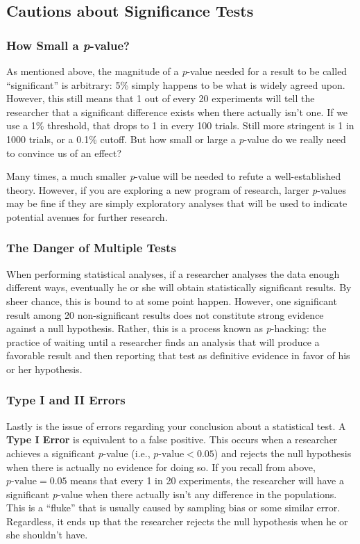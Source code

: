 \subsection{Cautions about Significance Tests}
\subsubsection{How Small a \textit{p}-value?}
As mentioned above, the magnitude of a \textit{p}-value needed for a result to be called ``significant'' is arbitrary: 5\% simply happens to be what is widely agreed upon. However, this still means that 1 out of every 20 experiments will tell the researcher that a significant difference exists when there actually isn't one. If we use a 1\% threshold, that drops to 1 in every 100 trials. Still more stringent is 1 in 1000 trials, or a 0.1\% cutoff. But how small or large a \textit{p}-value do we really need to convince us of an effect?

Many times, a much smaller \textit{p}-value will be needed to refute a well-established theory. However, if you are exploring a new program of research, larger \textit{p}-values may be fine if they are simply exploratory analyses that will be used to indicate potential avenues for further research.

\subsubsection{The Danger of Multiple Tests}
When performing statistical analyses, if a researcher analyses the data enough different ways, eventually he or she will obtain statistically significant results. By sheer chance, this is bound to at some point happen. However, one significant result among 20 non-significant results does not constitute strong evidence against a null hypothesis. Rather, this is a process known as \textit{p}-hacking: the practice of waiting until a researcher finds an analysis that will produce a favorable result and then reporting that test as definitive evidence in favor of his or her hypothesis.

\subsubsection{Type I and II Errors}
Lastly is the issue of errors regarding your conclusion about a statistical test. A \textbf{Type I Error} is equivalent to a false positive. This occurs when a researcher achieves a significant \textit{p}-value (i.e., $p\text{-value}<0.05$) and rejects the null hypothesis when there is actually no evidence for doing so. If you recall from above, $p\text{-value}=0.05$ means that every 1 in 20 experiments, the researcher will have a significant \textit{p}-value when there actually isn't any difference in the populations. This is a ``fluke'' that is usually caused by sampling bias or some similar error. Regardless, it ends up that the researcher rejects the null hypothesis when he or she shouldn't have.

